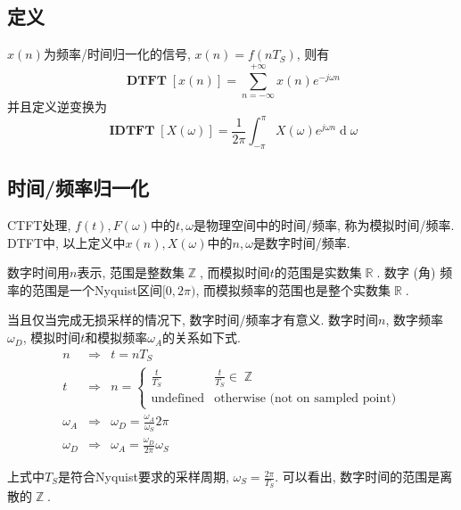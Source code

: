 \documentclass{ctexart}
\DeclareMathOperator{\DTFT}{\mathbf{DTFT}}
\DeclareMathOperator{\IDTFT}{\mathbf{IDTFT}}
\DeclareMathOperator{\ud}{\mathrm{d}}
\DeclareMathOperator{\Rset}{\mathbb{R}}
\DeclareMathOperator{\Zset}{\mathbb{Z}}
\begin{document}
\subsection{定义} $x(n)$为频率/时间归一化的信号, $x(n) = f(nT_S)$, 则有\[
    \DTFT[x(n)] = \sum_{n = -\infty}^{+\infty} x(n) e^{-j \omega n} \]
    并且定义逆变换为 \[
    \IDTFT[X(\omega)] = \frac{1}{2\pi} \int_{-\pi}^{\pi} X(\omega) e^{j \omega n} \ud \omega\]

\subsection{时间/频率归一化}
    CTFT处理, $f(t), F(\omega)$中的$t, \omega$是物理空间中的时间/频率, 称为模拟时间/频率.
    DTFT中, 以上定义中$x(n), X(\omega)$中的$n, \omega$是数字时间/频率.\par
    数字时间用$n$表示, 范围是整数集$\Zset$, 而模拟时间$t$的范围是实数集$\Rset$.
    数字 (角) 频率的范围是一个Nyquist区间$[0, 2\pi)$, 而模拟频率的范围也是整个实数集$\Rset$.\par
    当且仅当完成无损采样的情况下, 数字时间/频率才有意义.
    数字时间$n$, 数字频率$\omega_D$, 模拟时间$t$和模拟频率$\omega_A$的关系如下式.
    \begin{eqnarray*}
        n        & \Rightarrow & t = n T_S                      \\
        t        & \Rightarrow & n =
            \begin{cases} \frac{t}{T_S} & \frac{t}{T_S} \in \Zset \\ \text{undefined} & \text{otherwise (not on sampled point)} \end{cases}\\
        \omega_A & \Rightarrow & \omega_D = \frac{\omega_A}{\omega_S} 2\pi \\
        \omega_D & \Rightarrow & \omega_A = \frac{\omega_D}{2 \pi} \omega_S
    \end{eqnarray*}

    上式中$T_S$是符合Nyquist要求的采样周期, $\omega_S = \frac{2\pi}{T_S}$.
    可以看出, 数字时间的范围是离散的$\Zset$.
\end{document}
